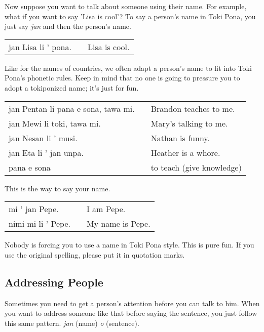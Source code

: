 Now suppose you want to talk about someone using their name. 
For example, what if you want to say 'Lisa is cool'? 
To say a person's name in Toki Pona, you just say \textit{jan} and then the person's name. 

\begin{supertabular}{p{5,5cm}|ll}
jan Lisa li ' pona. && Lisa is cool. \\
\end{supertabular} 

Like for the names of countries, we often adapt a person's name to fit into Toki Pona's phonetic rules. 
Keep in mind that no one is going to pressure you to adopt a tokiponized name; it's just for fun. 

\begin{supertabular}{p{5,5cm}|ll}
jan Pentan li pana e sona, tawa mi. && Brandon teaches to me. \\
jan Mewi li toki, tawa mi. && Mary's talking to me. \\
jan Nesan li ' musi. && Nathan is funny. \\
jan Eta li ' jan unpa. && Heather is a whore. \\
pana e sona && to teach (give knowledge) \\
\end{supertabular} 

This is the way to say your name. 

\begin{supertabular}{p{5,5cm}|ll}
mi ' jan Pepe. && I am Pepe. \\
nimi mi li ' Pepe. && My name is Pepe. 
\end{supertabular} 

Nobody is forcing you to use a name in Toki Pona style.
This is pure fun.
If you use the original spelling, please put it in quotation marks.
%
\subsection*{Addressing People}
%
Sometimes you need to get a person's attention before you can talk to him. 
When you want to address someone like that before saying the sentence, you just follow this same pattern. 
\textit{jan} (name) \textit{o} (sentence). 


